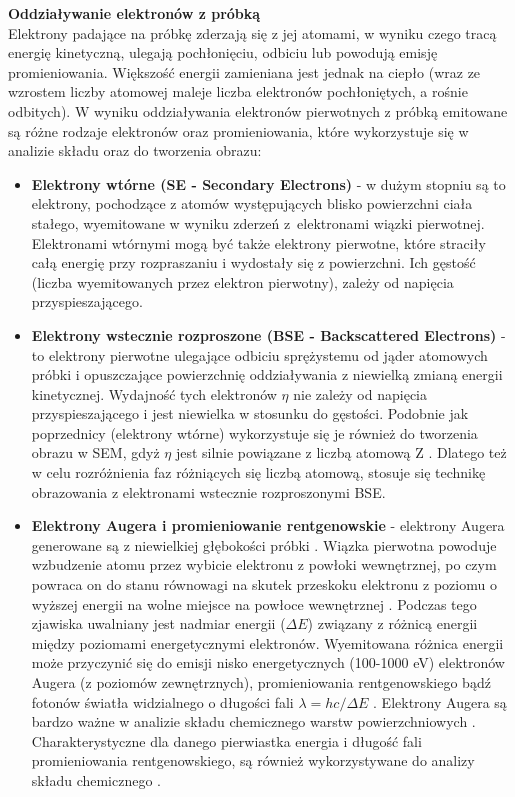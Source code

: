 \documentclass{article}
\begin{document}
\begin{enumerate}
{\bf Oddziaływanie elektronów z próbką}\\

Elektrony padające na próbkę zderzają się z jej atomami, w wyniku czego tracą energię kinetyczną, ulegają pochłonięciu, odbiciu lub powodują emisję promieniowania. Większość energii zamieniana jest jednak na ciepło (wraz ze wzrostem liczby atomowej maleje liczba elektronów pochłoniętych, a rośnie odbitych). W wyniku oddziaływania elektronów pierwotnych z próbką emitowane są różne rodzaje elektronów oraz promieniowania, które wykorzystuje się w analizie składu oraz do tworzenia obrazu:
\begin{itemize}
\item {\bf Elektrony wtórne (SE - Secondary Electrons)} - w dużym stopniu są to elektrony, pochodzące z atomów występujących blisko powierzchni ciała stałego, wyemitowane w wyniku zderzeń z~elektronami wiązki pierwotnej. Elektronami wtórnymi mogą być także elektrony pierwotne, które straciły całą energię przy rozpraszaniu i wydostały się z powierzchni. Ich gęstość  (liczba wyemitowanych przez elektron pierwotny), zależy od napięcia przyspieszającego.
\item {\bf Elektrony wstecznie rozproszone (BSE - Backscattered Electrons)} - to elektrony pierwotne ulegające odbiciu sprężystemu od jąder atomowych próbki i opuszczające powierzchnię oddziaływania z niewielką zmianą energii kinetycznej. Wydajność tych elektronów $\eta$ nie zależy od napięcia przyspieszającego i jest niewielka w stosunku do gęstości. Podobnie jak poprzednicy (elektrony wtórne) wykorzystuje się je również do tworzenia obrazu w SEM, gdyż $\eta$ jest silnie powiązane z liczbą atomową Z . Dlatego też w celu rozróżnienia faz różniących się liczbą atomową, stosuje się technikę obrazowania z elektronami wstecznie rozproszonymi BSE.

\item {\bf Elektrony Augera i promieniowanie rentgenowskie} - elektrony Augera generowane są z niewielkiej głębokości próbki . Wiązka pierwotna powoduje wzbudzenie atomu przez wybicie elektronu z powłoki wewnętrznej, po czym powraca on do stanu równowagi na skutek przeskoku elektronu z poziomu o wyższej energii na wolne miejsce na powłoce wewnętrznej . Podczas tego zjawiska uwalniany jest nadmiar energii ($\Delta E$) związany z różnicą energii między poziomami energetycznymi elektronów. Wyemitowana różnica energii może przyczynić się do emisji nisko energetycznych (100-1000 eV) elektronów Augera (z poziomów zewnętrznych), promieniowania rentgenowskiego  bądź fotonów światła widzialnego o długości fali $\lambda = hc/\Delta E$ . Elektrony Augera są bardzo ważne w analizie składu chemicznego warstw powierzchniowych . Charakterystyczne dla danego pierwiastka energia i długość fali promieniowania rentgenowskiego, są również wykorzystywane do analizy składu chemicznego .
\end{itemize}


\end{enumerate}
\end{document}

